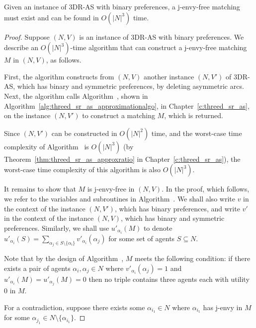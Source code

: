 \begin{thm}
\label{thm:threed_efr_as_jef_binary_algorithm}
Given an instance of 3DR-AS with binary preferences, a j-envy-free matching must exist and can be found in $O(|N|^3)$ time.
\end{thm}
\begin{proof}
Suppose $(N, V)$ is an instance of 3DR-AS with binary preferences. We describe an $O(|N|^3)$-time algorithm that can construct a j-envy-free matching $M$ in $(N, V)$, as follows.

First, the algorithm constructs from $(N, V)$ another instance $(N, V')$ of 3DR-AS, which has binary and symmetric preferences, by deleting asymmetric arcs.  Next, the algorithm calls Algorithm~, shown in Algorithm~\ref{alg:threed_sr_as_approximationalgo}, in Chapter~\ref{c:threed_sr_as}, on the instance $(N, V')$ to construct a matching $M$, which is returned.

Since $(N, V')$ can be constructed in $O(|N|^2)$ time, and the worst-case time complexity of Algorithm~ is $O(|N|^3)$ (by Theorem~\ref{thm:threed_sr_as_approxratio} in Chapter~\ref{c:threed_sr_as}), the worst-case time complexity of this algorithm is also $O(|N|^3)$. 

It remains to show that $M$ is j-envy-free in $(N, V)$. In the proof, which follows, we refer to the variables and subroutines in Algorithm~. We shall also write $v$ in the context of the instance $(N, V')$, which has binary preferences, and write $\mathit{v'}$ in the context of the instance $(N, V)$, which has binary and symmetric preferences. Similarly, we shall use $u'_{\alpha_i}(M)$ to denote $u'_{\alpha_i}(S) = \sum_{{\alpha_j}\in S \setminus \{ \alpha_i \}} \mathit{v'}_{\alpha_i}({\alpha_j})$ for some set of agents $S\subseteq N$.

Note that by the design of Algorithm~, $M$ meets the following condition: if there exists a pair of agents $\alpha_i, \alpha_j \in N$ where $\mathit{v'}_{\alpha_i}(\alpha_j) = 1$ and $u'_{\alpha_i}(M)=u'_{\alpha_j}(M)=0$ then no triple contains three agents each with utility $0$ in $M$. 

For a contradiction, suppose there exists some $\alpha_{i_1}\in N$ where $\alpha_{i_1}$ has j-envy in $M$ for some $\alpha_{j_1}\in N \setminus \{ \alpha_{i_1} \}$. 


\end{proof}
